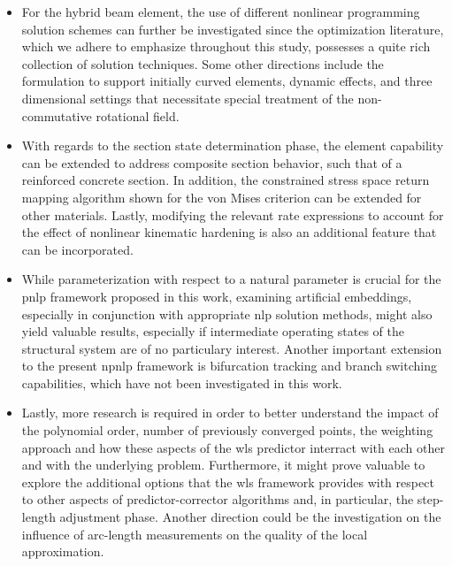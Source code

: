 \begin{itemize}
	\item For the hybrid beam element,  the use of different nonlinear 
	programming 
	solution schemes can further be investigated since the optimization 
	literature, 
	which we adhere to emphasize throughout this study, possesses a quite rich 
	collection of solution techniques.  Some other directions include the 
	formulation  
	to support initially curved elements, dynamic effects, and three 
	dimensional settings that necessitate special treatment of the 
	non-commutative 
	rotational field. 
	
	\item With regards to the section state determination phase, the element 
	capability can be extended to address composite section behavior, such that 
	of a 
	reinforced concrete section. In addition, the constrained stress space 
	return 
	mapping algorithm shown for the von Mises criterion can be extended for 
	other 
	materials. Lastly, modifying the relevant rate expressions to account for 
	the 
	effect of nonlinear kinematic hardening is also an additional feature that 
	can be 
	incorporated.
	
	\item While parameterization with respect to a natural parameter is crucial 
	for 
	the \acrshort{pnlp} framework proposed in this work, examining artificial 
	embeddings, especially in conjunction with appropriate \acrshort{nlp} 
	solution 
	methods, might also yield valuable results, especially if intermediate 
	operating 
	states of the structural system are of no particulary interest. Another 
	important 
	extension to the present \acrshort{npnlp} framework is bifurcation tracking 
	and 
	branch switching capabilities, which have not been investigated in this 
	work.
	
	\item Lastly, more research is required in order to better understand the 
	impact 
	of the polynomial order, number of previously converged points, the 
	weighting 
	approach and how these aspects of the \acrshort{wls} predictor interract 
	with each 
	other and with the underlying problem. Furthermore, it might prove valuable 
	to 
	explore the additional options that the \acrshort{wls} framework provides 
	with 
	respect to other aspects of predictor-corrector algorithms and, in 
	particular, the 
	step-length adjustment phase. Another direction could be the investigation 
	on the 
	influence of arc-length measurements on the quality of the local 
	approximation.
	
\end{itemize}


